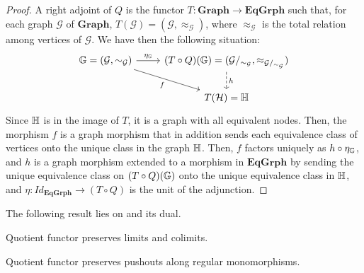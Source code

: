 \begin{proof}
    A right adjoint of $Q$ is the functor $T: \mathbf{Graph \rightarrow EqGrph}$
    such that, for each graph $\mathcal{G}$ of $\mathbf{Graph}$, $T(\mathcal{G}) = (\mathcal{G}, \approx_{\mathcal{G}})$, where $\approx_{\mathcal{G}}$ is the total relation among vertices of $\mathcal{G}$. We have then the following situation:
    \[
        \begin{tikzcd}
            \eqgraph{G} = (\mathcal{G}, \sim_{\mathcal{G}}) \arrow[r, "{\eta_{\eqgraph{G}}}"] \arrow[dr, "f"swap] & (T \circ Q)(\eqgraph{G}) = (\mathcal{G}/_{\sim_{\mathcal{G}}}, \approx_{\mathcal{G}/_{\sim_{\mathcal{G}}}}) \arrow[d, dashed, "h"] \\
            & T(\mathcal{H}) = \eqgraph{H}
        \end{tikzcd}
    \]
    Since $\mathbb{H}$ is in the image of $T$, it is a graph with all equivalent nodes. Then, the morphism $f$ is a graph morphism that in addition sends each equivalence class of vertices onto the unique class in the graph $\mathbb{H}$. Then, $f$ factors uniquely as $h \circ \eta_{\mathbb{G}}$, and $h$ is a graph morphism extended to a morphism in $\mathbf{EqGrph}$ by sending the unique equivalence class on $(T \circ Q)(\mathbb{G})$ onto the unique equivalence class in $\mathbb{H}$, and $\eta: Id_{\mathbf{EqGrph}} \rightarrow (T \circ Q)$ is the unit of the adjunction.
\end{proof}

The following result lies on  and its dual.

\begin{cor}\label{cor:quot_preserves_co_lim}
    Quotient functor preserves limits and colimits. 
\end{cor}


\begin{lemma}\label{lemma:quot_pres_reg_mono_pushouts}
    Quotient functor preserves pushouts along regular monomorphisms.
\end{lemma}




